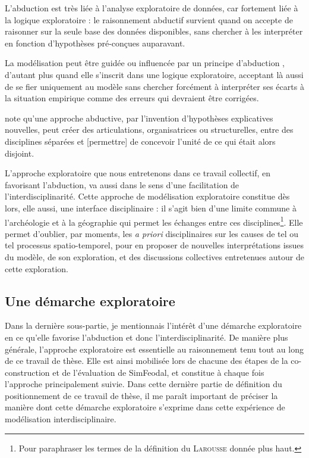 L'abduction est très liée à l'analyse exploratoire de données, car fortement liée à la logique exploratoire : le raisonnement abductif survient quand on accepte de raisonner sur la seule base des données disponibles, sans chercher à les interpréter en fonction d'hypothèses pré-conçues auparavant.

La modélisation peut être guidée ou influencée par un principe d'abduction \autocite[77]{banos_pour_2013}, d'autant plus quand elle s'inscrit dans une logique exploratoire, acceptant là aussi de se fier \og uniquement\fg{} au modèle sans chercher forcément à interpréter ses écarts à la situation empirique comme des erreurs qui devraient être corrigées.

\textcite{morin1994interdisciplinarite} note qu'une approche abductive, par \og l'invention d'hypothèses explicatives nouvelles\fg{}, peut créer \og des articulations, organisatrices ou structurelles, entre des disciplines séparées et [permettre] de concevoir l'unité de ce qui était alors disjoint\fg{}.

L'approche exploratoire que nous entretenons dans ce travail collectif, en favorisant l'abduction, va aussi dans le sens d'une facilitation de l'interdisciplinarité.
Cette approche de modélisation exploratoire constitue dès lors, elle aussi, une interface disciplinaire : il s'agit bien d'une limite commune à l'archéologie et à la géographie qui permet les échanges entre ces disciplines\footnote{
	Pour paraphraser les termes de la définition du \textsc{Larousse} donnée plus haut.
}.
Elle permet d'oublier, par moments, les \textit{a priori} disciplinaires sur les causes de tel ou tel processus spatio-temporel, pour en proposer de nouvelles interprétations issues du modèle, de son exploration, et des discussions collectives entretenues autour de cette exploration.

\subsection{Une démarche exploratoire}

Dans la dernière sous-partie, je mentionnais l'intérêt d'une démarche exploratoire en ce qu'elle favorise l'abduction et donc l'interdisciplinarité.
De manière plus générale, l'approche exploratoire est essentielle au raisonnement tenu tout au long de ce travail de thèse.
Elle est ainsi mobilisée lors de chacune des étapes de la co-construction et de l'évaluation de SimFeodal, et constitue à chaque fois l'approche principalement suivie.
Dans cette dernière partie de définition du positionnement de ce travail de thèse, il me paraît important de préciser la manière dont cette démarche exploratoire s'exprime dans cette expérience de modélisation interdisciplinaire.


